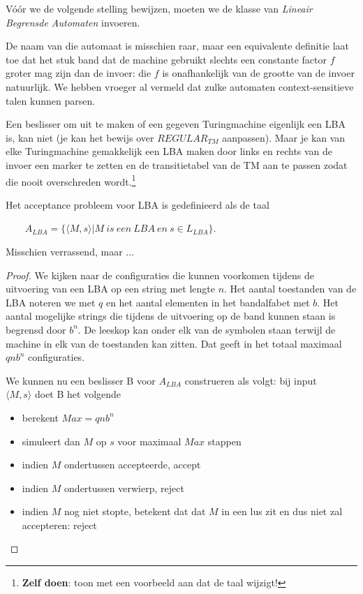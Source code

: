 

V\'{o}\'{o}r we de volgende stelling bewijzen, moeten we de klasse van {\em
Lineair Begrensde Automaten} invoeren.




De naam van die automaat is misschien raar, maar een equivalente
definitie laat toe dat het stuk band dat de machine gebruikt slechts
een constante factor $f$ groter mag zijn dan de invoer: die $f$ is
onafhankelijk van de grootte van de invoer natuurlijk. We hebben
vroeger al vermeld dat zulke automaten context-sensitieve talen kunnen
parsen.


Een beslisser om uit te maken of een gegeven Turingmachine eigenlijk
een LBA is, kan niet (je kan het bewijs over $REGULAR_{TM}$
aanpassen). Maar je kan van elke Turingmachine gemakkelijk een LBA
maken door links en rechts van de invoer een marker te zetten en de
transitietabel van de TM aan te passen zodat die nooit overschreden
wordt.\footnote{{\bf Zelf doen}: toon met een voorbeeld aan dat de taal wijzigt!}  

Het acceptance probleem voor LBA is gedefinieerd als de taal

$~~~~~~~~~A_{LBA} = \{\langle M,s \rangle | M~is~een~LBA~en~s \in L_{LBA}\}$.

Misschien verrassend, maar ...


\begin{proof}
We kijken naar de configuraties die kunnen voorkomen tijdens de
uitvoering van een LBA op een string met lengte $n$. Het aantal
toestanden van de LBA noteren we met $q$ en het aantal elementen in
het bandalfabet met $b$. Het aantal mogelijke strings die tijdens de
uitvoering op de band kunnen staan is begrensd door $b^n$. De leeskop
kan onder elk van de symbolen staan terwijl de machine in elk van de
toestanden kan zitten. Dat geeft in het totaal maximaal $qnb^n$
configuraties.


We kunnen nu een beslisser B voor $A_{LBA}$ construeren als volgt: bij
input \\ $\langle M,s \rangle$ doet B het volgende
\begin{itemize}
\item berekent $Max = qnb^n$
\item simuleert dan $M$ op $s$ voor maximaal $Max$ stappen
\item indien $M$ ondertussen accepteerde, accept
\item indien $M$ ondertussen verwierp, reject
\item indien $M$ nog niet stopte, betekent dat dat $M$ in een lus zit
en dus niet zal accepteren: reject
\end{itemize}
\end{proof} 

